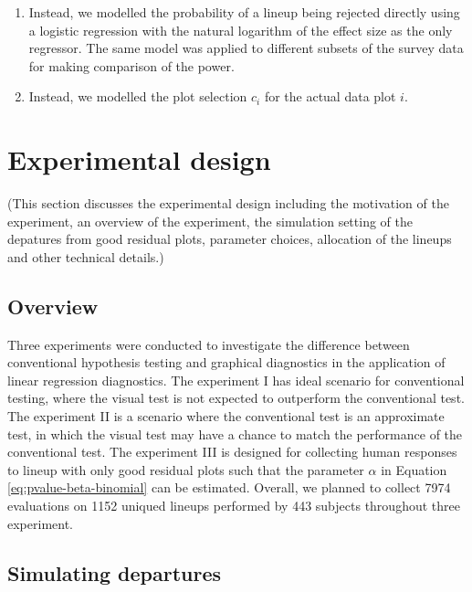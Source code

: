 \documentclass[]{interact}
\theoremstyle{plain}%
\theoremstyle{definition}
\theoremstyle{remark}
\begin{document}
\begin{enumerate}
\def\labelenumi{(\arabic{enumi})}
\item
  Instead, we modelled the probability of a lineup being rejected
  directly using a logistic regression with the natural logarithm of the
  effect size as the only regressor. The same model was applied to
  different subsets of the survey data for making comparison of the
  power.
\item
  Instead, we modelled the plot selection \(c_i\) for the actual data
  plot \(i\).
\end{enumerate}

\hypertarget{experimental-design}{%
\section{Experimental design}\label{experimental-design}}

(This section discusses the experimental design including the motivation
of the experiment, an overview of the experiment, the simulation setting
of the depatures from good residual plots, parameter choices, allocation
of the lineups and other technical details.)

\hypertarget{overview}{%
\subsection{Overview}\label{overview}}

Three experiments were conducted to investigate the difference between
conventional hypothesis testing and graphical diagnostics in the
application of linear regression diagnostics. The experiment I has ideal
scenario for conventional testing, where the visual test is not expected
to outperform the conventional test. The experiment II is a scenario
where the conventional test is an approximate test, in which the visual
test may have a chance to match the performance of the conventional
test. The experiment III is designed for collecting human responses to
lineup with only good residual plots such that the parameter \(\alpha\)
in Equation \ref{eq:pvalue-beta-binomial} can be estimated. Overall, we
planned to collect 7974 evaluations on 1152 uniqued lineups performed by
443 subjects throughout three experiment.

\hypertarget{simulating-departures}{%
\subsection{Simulating departures}\label{simulating-departures}}
\end{document}
